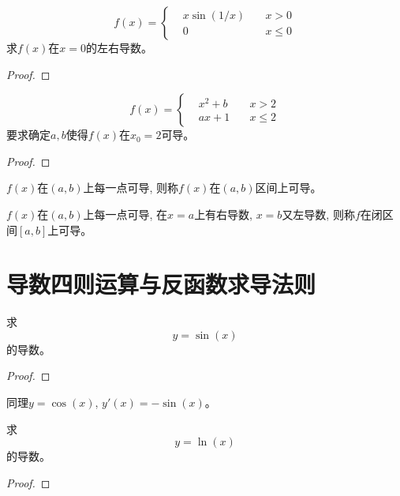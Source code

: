 \begin{proposition}
    \begin{equation*}
        f(x) = \left\{ 
            \begin{aligned}
                &x\sin(1/x) &\quad x>0 \\
                &0          &\quad x \le 0
            \end{aligned}
        \right.
    \end{equation*}
    求$f(x)$在$x = 0$的左右导数。
\end{proposition}
\begin{proof}
    
\end{proof}

\begin{proposition}
    \begin{equation*}
        f(x) = \left\{ 
            \begin{aligned}
                & x^2 + b &\quad x > 2 \\
                & ax + 1 &\quad x \le 2
            \end{aligned}
        \right.
    \end{equation*}
    要求确定$a, b$使得$f(x)$在$x_0 = 2$可导。
\end{proposition}
\begin{proof}
    
\end{proof}

$f(x)$在$(a, b)$上每一点可导, 则称$f(x)$在$(a, b)$区间上可导。

$f(x)$在$(a, b)$上每一点可导, 在$x = a$上有右导数, $x = b$又左导数, 则称$f$在闭区间$[a, b]$上可导。

\section{导数四则运算与反函数求导法则}
\begin{proposition}
    求
    \[ y = \sin(x) \]
    的导数。
\end{proposition}
\begin{proof}
    
\end{proof}
同理$y = \cos(x)$, $y'(x) = -\sin(x)$。

\begin{proposition}
    求
    \[ y = \ln(x) \]
    的导数。
\end{proposition}
\begin{proof}
    
\end{proof}

